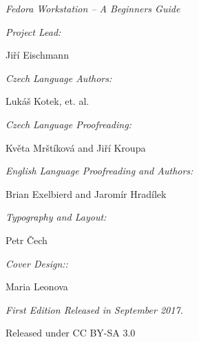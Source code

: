 \newpage\mbox{}\newpage
\begin{center}

{\it\large Fedora Workstation -- A Beginners Guide}

\bigskip

{\it Project Lead:}

Jiří Eischmann

{\it Czech Language Authors:}

Lukáš Kotek, et. al.

{\it Czech Language Proofreading:}

Květa Mrštíková and Jiří Kroupa

{\it English Language Proofreading and Authors:}

Brian Exelbierd and Jaromír Hradílek

{\it Typography and Layout:}

Petr Čech

{\it Cover Design::}

Maria Leonova

{\it First Edition Released in September 2017.

Released under CC BY-SA 3.0}
\end{center}

